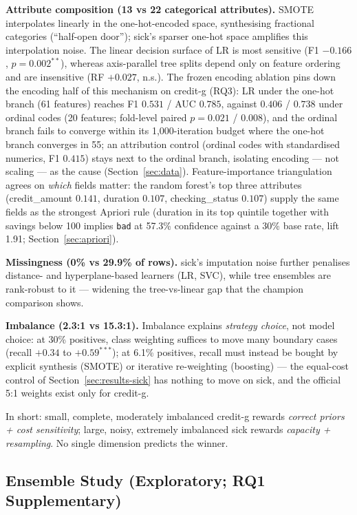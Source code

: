 \textbf{Attribute composition (13 vs 22 categorical attributes).} SMOTE interpolates linearly in the one-hot-encoded space, synthesising fractional categories (``half-open door''); sick's sparser one-hot space amplifies this interpolation noise. The linear decision surface of LR is most sensitive (F1 $-0.166$, $p=0.002^{**}$), whereas axis-parallel tree splits depend only on feature ordering and are insensitive (RF $+0.027$, n.s.). The frozen encoding ablation pins down the encoding half of this mechanism on credit-g (RQ3): LR under the one-hot branch (61 features) reaches F1 $0.531$ / AUC $0.785$, against $0.406$ / $0.738$ under ordinal codes (20 features; fold-level paired $p=0.021$ / $0.008$), and the ordinal branch fails to converge within its 1{,}000-iteration budget where the one-hot branch converges in 55; an attribution control (ordinal codes with standardised numerics, F1 $0.415$) stays next to the ordinal branch, isolating encoding --- not scaling --- as the cause (Section~\ref{sec:data}). Feature-importance triangulation agrees on \emph{which} fields matter: the random forest's top three attributes (credit\_amount $0.141$, duration $0.107$, checking\_status $0.107$) supply the same fields as the strongest Apriori rule (duration in its top quintile together with savings below 100 implies \texttt{bad} at 57.3\% confidence against a 30\% base rate, lift 1.91; Section~\ref{sec:apriori}).

\textbf{Missingness (0\% vs 29.9\% of rows).} sick's imputation noise further penalises distance- and hyperplane-based learners (LR, SVC), while tree ensembles are rank-robust to it --- widening the tree-vs-linear gap that the champion comparison shows.

\textbf{Imbalance (2.3:1 vs 15.3:1).} Imbalance explains \emph{strategy choice}, not model choice: at 30\% positives, class weighting suffices to move many boundary cases (recall $+0.34$ to $+0.59^{***}$); at 6.1\% positives, recall must instead be bought by explicit synthesis (SMOTE) or iterative re-weighting (boosting) --- the equal-cost control of Section~\ref{sec:results-sick} has nothing to move on sick, and the official 5:1 weights exist only for credit-g.

In short: small, complete, moderately imbalanced credit-g rewards \emph{correct priors + cost sensitivity}; large, noisy, extremely imbalanced sick rewards \emph{capacity + resampling}. No single dimension predicts the winner.

\subsection{Ensemble Study (Exploratory; RQ1 Supplementary)}
\label{sec:results-ensemble}

